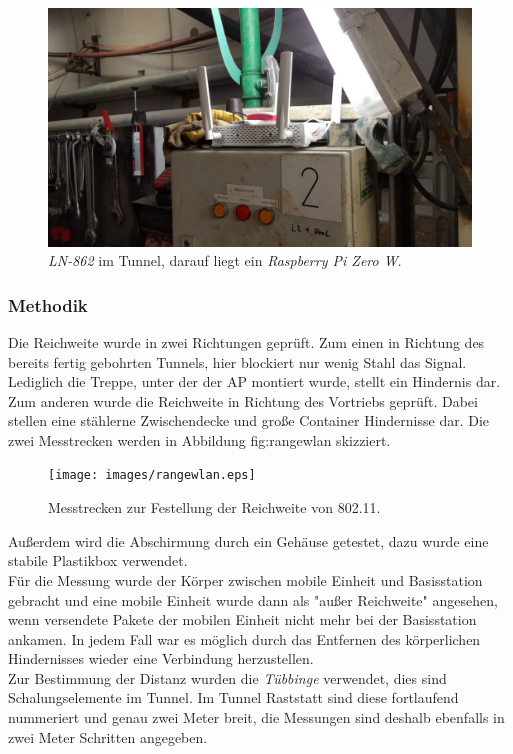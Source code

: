 \begin{figure}[h]
  \centering
	\includegraphics[width=\textwidth]{images/applacement.jpg}
  \caption{\emph{LN-862} im Tunnel, darauf liegt ein \emph{Raspberry Pi Zero W}.}
  \label{fig:applacement}
\end{figure}

\subsubsection{Methodik}
Die Reichweite wurde in zwei Richtungen geprüft.
Zum einen in Richtung des bereits fertig gebohrten Tunnels, hier blockiert nur wenig Stahl das Signal. 
Lediglich die Treppe, unter der der AP montiert wurde, stellt ein Hindernis dar.
Zum anderen wurde die Reichweite in Richtung des Vortriebs geprüft.
Dabei stellen eine stählerne Zwischendecke und große Container Hindernisse dar.
Die zwei Messtrecken werden in Abbildung {fig:rangewlan} skizziert.

\begin{figure}[h!]
  \centering
	\texttt{[image: images/rangewlan.eps]}
  \caption{Messtrecken zur Festellung der Reichweite von 802.11.}
  \label{fig:rangewlan}
\end{figure}

Außerdem wird die Abschirmung durch ein Gehäuse getestet, dazu wurde eine stabile Plastikbox verwendet.\\
Für die Messung wurde der Körper zwischen mobile Einheit und Basisstation gebracht und eine mobile Einheit wurde dann als "{}außer Reichweite"{} angesehen, wenn versendete Pakete der mobilen Einheit nicht mehr bei der Basisstation ankamen.
In jedem Fall war es möglich durch das Entfernen des körperlichen Hindernisses wieder eine Verbindung herzustellen.\\
Zur Bestimmung der Distanz wurden die \emph{Tübbinge} verwendet, dies sind Schalungselemente im Tunnel.
Im Tunnel Raststatt sind diese fortlaufend nummeriert und genau zwei Meter breit, die Messungen sind deshalb ebenfalls in zwei Meter Schritten angegeben.

